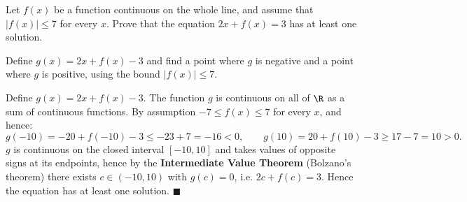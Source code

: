 
\begin{question}
Let $f(x)$ be a function continuous on the whole line, and assume that $|f(x)|\le 7$ for every $x$. Prove that the equation $2x+f(x)=3$ has at least one solution.
\end{question}

\begin{hint}
Define $g(x)=2x+f(x)-3$ and find a point where $g$ is negative and a point where $g$ is positive, using the bound $|f(x)|\le 7$.
\end{hint}

\begin{solution}
Define $g(x)=2x+f(x)-3$. The function $g$ is continuous on all of $\R$ as a sum of continuous functions. By assumption $-7\le f(x)\le 7$ for every $x$, and hence:
\[ g(-10)=-20+f(-10)-3\le -23+7=-16<0,\qquad g(10)=20+f(10)-3\ge 17-7=10>0. \]
$g$ is continuous on the closed interval $[-10,10]$ and takes values of opposite signs at its endpoints, hence by the \textbf{Intermediate Value Theorem} (Bolzano's theorem) there exists $c\in(-10,10)$ with $g(c)=0$, i.e. $2c+f(c)=3$. Hence the equation has at least one solution. $\blacksquare$
\end{solution}
